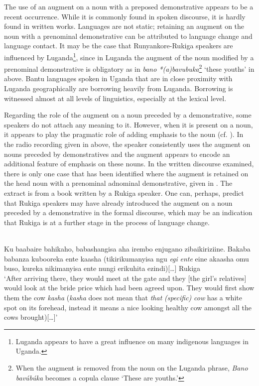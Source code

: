 \documentclass[output=paper 		  ]{langscibook}
\begin{document}
The use of an augment on a noun with a preposed demonstrative appears to be a recent occurrence. While it is commonly found in spoken discourse, it is hardly found in written works. Languages are not static; retaining an augment on the noun with a prenominal demonstrative can be attributed to language change and language contact. It may be the case that Run\-yan\-ko\-re-Ru\-ki\-ga speakers are influenced by Luganda\footnote{Luganda appears to have a great influence on many indigenous languages in Uganda.}, since in Luganda the augment of the noun modified by a prenominal demonstrative is obligatory as in \textit{bano *(a)bavubuka}\footnote{When the augment is removed from the noun on the Luganda phrase, \textit{Bano bavúbúka} becomes a copula clause ‘These are youths.’} ‘these youths’ in  above. Bantu languages spoken in Uganda that are in close proximity with Luganda geographically are borrowing heavily from Luganda. Borrowing is witnessed almost at all levels of linguistics, especially at the lexical level.

Regarding the role of the augment on a noun preceded by a demonstrative, some speakers do not attach any meaning to it. However, when it is present on a noun, it appears to play the pragmatic role of adding emphasis to the noun (cf. \citealt{Asiimwe2014}). In the radio recording given in  above, the speaker consistently uses the augment on nouns preceded by demonstratives and the augment appears to encode an additional feature of emphasis on these nouns. In the written discourse examined, there is only one case that has been identified where the augment is retained on the head noun with a prenominal adnominal demonstrative, given in . The extract is from a book written by a Rukiga speaker. One can, perhaps, predict that Rukiga speakers may have already introduced the augment on a noun preceded by a demonstrative in the formal discourse, which may be an indication that Rukiga is at a further stage in the process of language change.


\eanoraggedright%
    \label{ex:asiimwe:36} \citet[199]{Asiimwe2014}\\
    Ku baabaire bahikaho, babashangisa aha irembo enjugano zibaikiriziine. Bakaba babanza kubooreka ente kaasha (tikirikumanyisa ngu \emph{egi} \emph{ente} eine akaasha omu buso, kureka nikimanyisa ente nungi erikuhita ezindi)[…] \hfill  Rukiga \citep[86]{Karwemera1994}\\
‘After arriving there, they would meet at the gate and they [the girl’s relatives] would look at the bride price which had been agreed upon. They would first show them the cow \textit{kasha} (\textit{kasha} does not mean that \emph{that} \emph{(specific)} \emph{cow} has a white spot on its forehead, instead it means a nice looking healthy cow amongst all the cows brought)[…]’
\z
\end{document}
